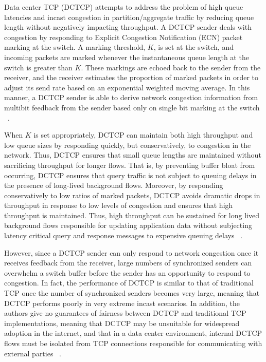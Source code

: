 Data center TCP (DCTCP) attempts to address the problem of high queue latencies and incast congestion in partition/aggregate traffic by reducing queue length without negatively impacting throughput. A DCTCP sender deals with congestion by responding to Explicit Congestion Notification (ECN) packet marking at the switch. A marking threshold, $K$, is set at the switch, and incoming packets are marked whenever the instantaneous queue length at the switch is greater than $K$. These markings are echoed back to the sender from the receiver, and the receiver estimates the proportion of marked packets in order to adjust its send rate based on an exponential weighted moving average. In this manner, a DCTCP sender is able to derive network congestion information from multibit feedback from the sender based only on single bit marking at the switch ~\cite{alizadeh_data_2010}.

When $K$ is set appropriately, DCTCP can maintain both high throughput and low queue sizes by responding quickly, but conservatively, to congestion in the network. Thus, DCTCP ensures that small queue lengths are maintained without sacrificing throughput for longer flows. That is, by preventing buffer bloat from occurring, DCTCP ensures that query traffic is not subject to queuing delays in the presence of long-lived background flows. Moreover, by responding conservatively to low ratios of marked packets, DCTCP avoids dramatic drops in throughput in response to low levels of congestion and ensures that high throughput is maintained. Thus, high throughput can be sustained for long lived background flows responsible for updating application data without subjecting latency critical query and response messages to expensive queuing delays ~\cite{alizadeh_data_2010}.

However, since a DCTCP sender can only respond to network congestion once it receives feedback from the receiver, large numbers of synchronized senders can overwhelm a switch buffer before the sender has an opportunity to respond to congestion. In fact, the performance of DCTCP is similar to that of traditional TCP once the number of synchronized senders becomes very large, meaning that DCTCP performs poorly in very extreme incast scenarios. In addition, the authors give no guarantees of fairness between DCTCP and traditional TCP implementations, meaning that DCTCP may be unsuitable for widespread adoption in the internet, and that in a data center environment, internal DCTCP flows must be isolated from TCP connections responsible for communicating with external parties ~\cite{alizadeh_data_2010}. 

